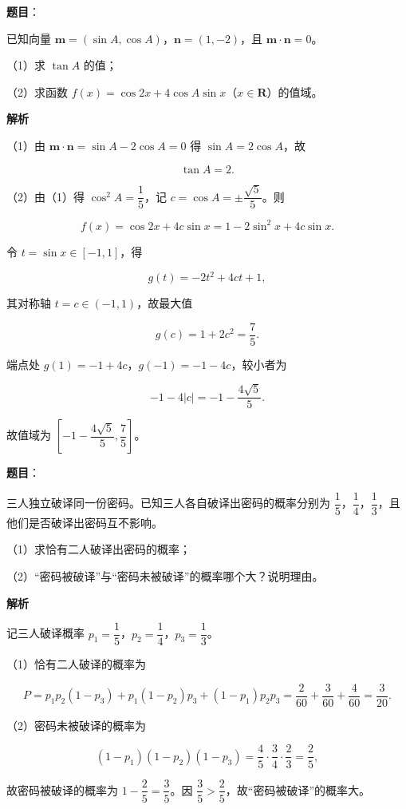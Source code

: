 \begin{answer}

\textbf{题目}：

已知向量 $\boldsymbol m=(\sin A,\cos A)$，$\boldsymbol n=(1,-2)$，且 $\boldsymbol m\cdot\boldsymbol n=0$。

（1）求 $\tan A$ 的值；

（2）求函数 $f(x)=\cos 2x+4\cos A\sin x$（$x\in\mathbf R$）的值域。

\textbf{解析}

（1）由 $\boldsymbol m\cdot\boldsymbol n=\sin A-2\cos A=0$ 得 $\sin A=2\cos A$，故

\nopagebreak[4]
\[\tan A=2.\]

（2）由（1）得 $\cos^2A=\dfrac15$，记 $c=\cos A=\pm\dfrac{\sqrt5}5$。则

\nopagebreak[4]
\[f(x)=\cos2x+4c\sin x=1-2\sin^2x+4c\sin x.\]

令 $t=\sin x\in[-1,1]$，得

\nopagebreak[4]
\[g(t)=-2t^2+4ct+1,\]

其对称轴 $t=c\in(-1,1)$，故最大值

\nopagebreak[4]
\[g(c)=1+2c^2=\frac75.\]

端点处 $g(1)=-1+4c$，$g(-1)=-1-4c$，较小者为

\nopagebreak[4]
\[-1-4|c|=-1-\frac{4\sqrt5}5.\]

故值域为 $\left[-1-\dfrac{4\sqrt5}5,\dfrac75\right]$。


\end{answer}
\begin{answer}

\textbf{题目}：

三人独立破译同一份密码。已知三人各自破译出密码的概率分别为 $\dfrac15$，$\dfrac14$，$\dfrac13$，且他们是否破译出密码互不影响。

（1）求恰有二人破译出密码的概率；

（2）“密码被破译”与“密码未被破译”的概率哪个大？说明理由。

\textbf{解析}

记三人破译概率 $p_1=\dfrac15$，$p_2=\dfrac14$，$p_3=\dfrac13$。

（1）恰有二人破译的概率为

\nopagebreak[4]
\[P=p_1p_2(1-p_3)+p_1(1-p_2)p_3+(1-p_1)p_2p_3=\frac2{60}+\frac3{60}+\frac4{60}=\frac3{20}.\]

（2）密码未被破译的概率为

\nopagebreak[4]
\[(1-p_1)(1-p_2)(1-p_3)=\frac45\cdot\frac34\cdot\frac23=\frac25,\]

故密码被破译的概率为 $1-\dfrac25=\dfrac35$。因 $\dfrac35>\dfrac25$，故“密码被破译”的概率大。


\end{answer}
